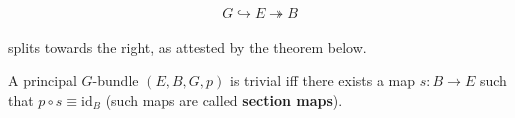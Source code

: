 \documentclass[11pt,a4paper]{article}
\begin{document}
\begin{equation*}
    G \hookrightarrow E \twoheadrightarrow B \tag{† †}
\end{equation*}\\

splits towards the right, as attested by the theorem below.


\begin{theorem}
A principal $G$-bundle $(E, B, G, p)$ is trivial iff there exists a map $s: B \rightarrow E$ such that $p\circ s \equiv \text{id}_B$ (such maps are called \textbf{section maps}).
\end{theorem}

\end{document}
